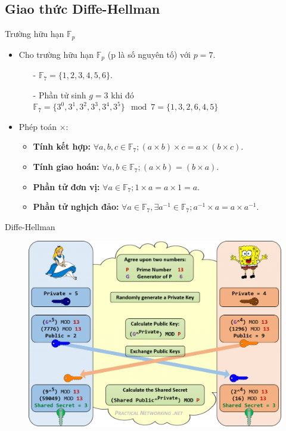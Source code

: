 \documentclass[compress]{beamer}
\begin{document}
\subsection{Giao thức Diffe-Hellman}
\begin{frame}{Trường hữu hạn $\mathbb{F}_p$}
\begin{itemize}
\item Cho trường hữu hạn $\mathbb{F}_p$ (p là số nguyên tố) với $p = 7$.
\begin{itemize}
\item[-] $\mathbb{F}_7 = \{1 ,2 ,3 ,4 ,5 ,6\}$.
\item[-] Phần tử sinh $g = 3$ khi đó $\mathbb{F}_7 = \{3^0, 3^1, 3^2, 3^3, 3^4, 3^5\} \mod 7 = \{1, 3, 2, 6, 4, 5\}$ 
\end{itemize}
\item Phép toán $\times$:
\begin{itemize}
\item \textbf{Tính kết hợp:} $\forall a,b,c \in \mathbb{F}_7; (a \times b) \times c = a \times (b \times c)$.
\item \textbf{Tính giao hoán:} $\forall a,b \in \mathbb{F}_7; (a \times b) = (b \times a)$.
\item \textbf{Phần tử đơn vị:} $\forall a \in \mathbb{F}_7; 1 \times a = a \times 1 = a$.
\item \textbf{Phần tử nghịch đảo:} $\forall a \in \mathbb{F}_7, \exists a^{-1} \in \mathbb{F}_7; a^{-1} \times a = a \times a^{-1}$.
\end{itemize}
\end{itemize}
\end{frame}
\begin{frame}{Diffe-Hellman}
\begin{center}
\begin{figure}
\includegraphics[width=0.9\linewidth]{../diffe-hellman.png}
\end{figure}
\end{center}
\end{frame}
\end{document}
